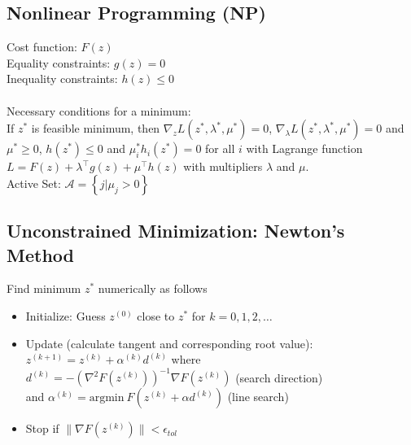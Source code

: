 \documentclass[english]{latex4ei/latex4ei_sheet}
\begin{document}
\begin{sectionbox}

\subsection{Nonlinear Programming (NP)}
Cost function: $F(z)$\\
Equality constraints: $g(z)=0$\\
Inequality constraints: $h(z)\leq 0$\\
\\
Necessary conditions for a minimum:\\
If $z^{*}$ is feasible minimum, then $\nabla_{z} L\left(z^{*}, \lambda^{*}, \mu^{*}\right)=0$, $\nabla_{\lambda} L\left(z^{*}, \lambda^{*}, \mu^{*}\right)=0$ and $\mu^{*} \geq 0$, $h\left(z^{*}\right) \leq 0$ and $\mu_{i}^{*} h_{i}\left(z^{*}\right)=0$ for all $i$ with Lagrange function $L=F(z)+\lambda^{\top} g(z)+\mu^{\top} h(z)$ with multipliers $\lambda$ and $\mu$.\\
Active Set: $\mathcal{A}=\left\{j | \mu_{j}>0\right\}$\\

\subsection{Unconstrained Minimization: Newton's Method}
Find minimum $z^{*}$ numerically as follows
\begin{itemize}
    \item Initialize: Guess $z^{(0)}$ close to $z^{*}$ for $k=0,1,2,\ldots$
    \item Update (calculate tangent and corresponding root value):\\
    $z^{(k+1)}=z^{(k)}+\alpha^{(k)} d^{(k)}$ where\\ $d^{(k)}=-\left(\nabla^{2} F\left(z^{(k)}\right)\right)^{-1} \nabla F\left(z^{(k)}\right)$ (search direction)\\
    and $\alpha^{(k)}=\textrm{argmin}\ F(z^{(k)}+\alpha d^{(k)})$ (line search)
    \item Stop if $\|\nabla F(z^{(k)})\|<\epsilon_{tol}$
\end{itemize}\vspace{0.2cm}


\end{sectionbox}
\end{document}

